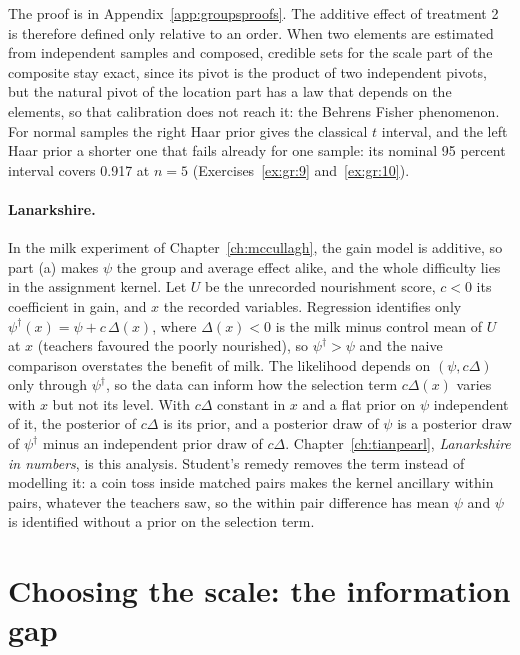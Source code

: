 The proof is in Appendix~\ref{app:groupsproofs}. The additive effect of treatment 2 is therefore defined only relative to an order. When two elements are estimated from independent samples and composed, credible sets for the scale part of the composite stay exact, since its pivot is the product of two independent pivots, but the natural pivot of the location part has a law that depends on the elements, so that calibration does not reach it: the Behrens Fisher phenomenon. For normal samples the right Haar prior gives the classical $t$ interval, and the left Haar prior a shorter one that fails already for one sample: its nominal 95 percent interval covers 0.917 at $n=5$ (Exercises~\ref{ex:gr:9} and~\ref{ex:gr:10}).

\paragraph{Lanarkshire.} In the milk experiment of Chapter~\ref{ch:mccullagh}, the gain model is additive, so part (a) makes $\psi$ the group and average effect alike, and the whole difficulty lies in the assignment kernel. Let $U$ be the unrecorded nourishment score, $c<0$ its coefficient in gain, and $x$ the recorded variables. Regression identifies only $\psi^{\dagger}(x)=\psi+c\,\Delta(x)$, where $\Delta(x)<0$ is the milk minus control mean of $U$ at $x$ (teachers favoured the poorly nourished), so $\psi^{\dagger}>\psi$ and the naive comparison overstates the benefit of milk. The likelihood depends on $(\psi,c\Delta)$ only through $\psi^{\dagger}$, so the data can inform how the selection term $c\Delta(x)$ varies with $x$ but not its level. With $c\Delta$ constant in $x$ and a flat prior on $\psi$ independent of it, the posterior of $c\Delta$ is its prior, and a posterior draw of $\psi$ is a posterior draw of $\psi^{\dagger}$ minus an independent prior draw of $c\Delta$. Chapter~\ref{ch:tianpearl}, \emph{Lanarkshire in numbers}, is this analysis. Student's remedy removes the term instead of modelling it: a coin toss inside matched pairs makes the kernel ancillary within pairs, whatever the teachers saw, so the within pair difference has mean $\psi$ and $\psi$ is identified without a prior on the selection term.

\section{Choosing the scale: the information gap}\label{gr:sec:gap}

